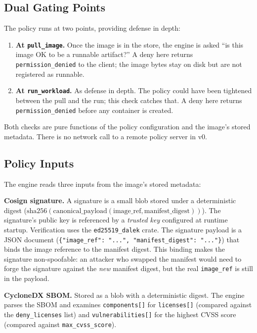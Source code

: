 \documentclass[11pt,a4paper]{article}
\begin{document}
\subsection{Dual Gating Points}

The policy runs at two points, providing defense in depth:

\begin{enumerate}[leftmargin=*]
    \item \textbf{At \texttt{pull\_image}.} Once the image is in the store, the engine is asked ``is this image OK to be a runnable artifact?'' A deny here returns \texttt{permission\_denied} to the client; the image bytes stay on disk but are not registered as runnable.
    \item \textbf{At \texttt{run\_workload}.} As defense in depth. The policy could have been tightened between the pull and the run; this check catches that. A deny here returns \texttt{permission\_denied} before any container is created.
\end{enumerate}

Both checks are pure functions of the policy configuration and the image's stored metadata. There is no network call to a remote policy server in v0.

\subsection{Policy Inputs}

The engine reads three inputs from the image's stored metadata:

\textbf{Cosign signature.} A signature is a small blob stored under a deterministic digest ($\text{sha256}(\text{canonical\_payload}(\text{image\_ref}, \text{manifest\_digest}))$). The signature's public key is referenced by a \emph{trusted key} configured at runtime startup. Verification uses the \texttt{ed25519\_dalek} crate. The signature payload is a JSON document (\texttt{\{"image\_ref": "...", "manifest\_digest": "..."\}}) that binds the image reference to the manifest digest. This binding makes the signature non-spoofable: an attacker who swapped the manifest would need to forge the signature against the \emph{new} manifest digest, but the real \texttt{image\_ref} is still in the payload.

\textbf{CycloneDX SBOM.} Stored as a blob with a deterministic digest. The engine parses the SBOM and examines \texttt{components[]} for \texttt{licenses[]} (compared against the \texttt{deny\_licenses} list) and \texttt{vulnerabilities[]} for the highest CVSS score (compared against \texttt{max\_cvss\_score}).
\end{document}
